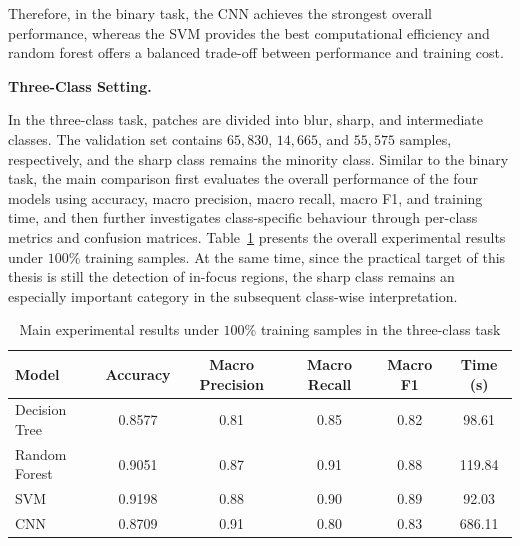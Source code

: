\par Therefore, in the binary task, the CNN achieves the strongest overall
performance, whereas the SVM provides the best computational efficiency and
random forest offers a balanced trade-off between performance and training
cost.

\par\medskip \noindent\textbf{Three-Class Setting.}
\par In the three-class task, patches are divided into blur, sharp, and
intermediate classes. The validation set contains $65,830$, $14,665$, and
$55,575$ samples, respectively, and the sharp class remains the minority
class. Similar to the binary task, the main comparison first evaluates the
overall performance of the four models using accuracy, macro precision, macro
recall, macro F1, and training time, and then further investigates
class-specific behaviour through per-class metrics and confusion matrices.
Table~\ref{tab:main-triclass-100} presents the overall experimental results
under $100\%$ training samples.
At the same time, since the practical target of this thesis is still the
detection of in-focus regions, the sharp class remains an especially important
category in the subsequent class-wise interpretation.

\begin{table}[htbp]
    \centering
    \caption{Main experimental results under $100\%$ training samples in the three-class task}
    \label{tab:main-triclass-100}
    \begin{tabular}{lccccc}
        \toprule
        Model & Accuracy & Macro Precision &
        Macro Recall & Macro F1 & Time (s) \\
        \midrule
        Decision Tree & 0.8577 & 0.81 & 0.85 & 0.82 & 98.61  \\
        Random Forest & 0.9051 & 0.87 & 0.91 & 0.88 & 119.84 \\
        SVM           & 0.9198 & 0.88 & 0.90 & 0.89 & 92.03  \\
        CNN           & 0.8709 & 0.91 & 0.80 & 0.83 & 686.11 \\
        \bottomrule
    \end{tabular}
\end{table}

